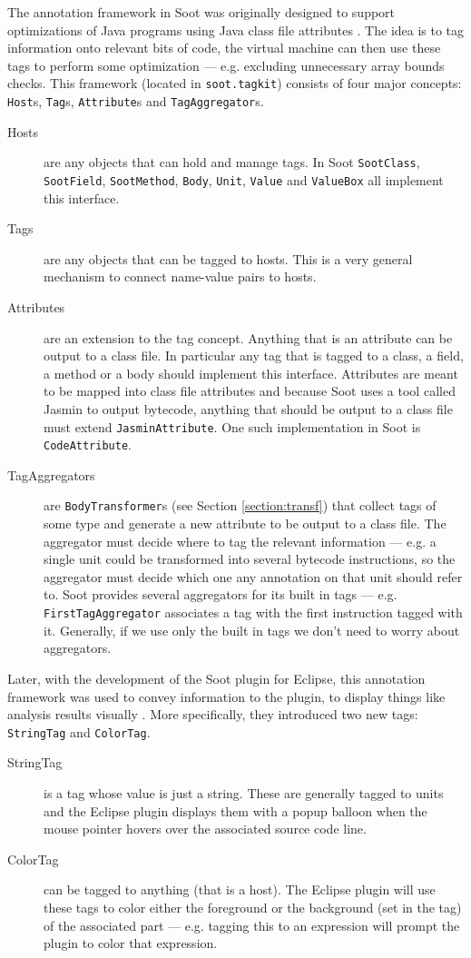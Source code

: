 \documentclass{article}
\newcommand{\code}[1]{\texttt{\small #1}}
\begin{document}
The annotation framework in Soot was originally designed to support
optimizations of Java programs using Java class file attributes
\cite{pominville00framework}. The idea is to tag information onto
relevant bits of code, the virtual machine can then use these tags to
perform some optimization --- e.g. excluding unnecessary array bounds
checks.  This framework (located in \code{soot.tagkit}) consists of
four major concepts: \code{Host}s, \code{Tag}s, \code{Attribute}s and
\code{TagAggregator}s.
\begin{description}
\item[Hosts] are any objects that can hold and manage tags. In Soot
  \code{SootClass}, \code{SootField}, \code{SootMethod}, \code{Body},
  \code{Unit}, \code{Value} and \code{ValueBox} all implement this
  interface.
\item[Tags] are any objects that can be tagged to hosts. This is a
  very general mechanism to connect name-value pairs to hosts.
\item[Attributes] are an extension to the tag concept. Anything that
  is an attribute can be output to a class file. In particular any tag
  that is tagged to a class, a field, a method or a body should
  implement this interface. Attributes are meant to be mapped into
  class file attributes and because Soot uses a tool called Jasmin to
  output bytecode, anything that should be output to a class file must
  extend \code{JasminAttribute}. One such implementation in Soot is
  \code{CodeAttribute}.
\item[TagAggregators] are \code{BodyTransformer}s (see
  Section \ref{section:transf}) that collect tags of some type and generate
  a new attribute to be output to a class file. The aggregator must
  decide where to tag the relevant information --- e.g. a single unit
  could be transformed into several bytecode instructions, so the
  aggregator must decide which one any annotation on that unit should
  refer to. Soot provides several aggregators for its built in tags
  --- e.g. \code{FirstTagAggregator} associates a tag with the first
  instruction tagged with it. Generally, if we use only the built in
  tags we don't need to worry about aggregators.
\end{description}

Later, with the development of the Soot plugin for Eclipse, this
annotation framework was used to convey information to the plugin, to
display things like analysis results visually \cite{lhot.lhot.ea04}.
More specifically, they introduced two new tags: \code{StringTag} and
\code{ColorTag}.
\begin{description}
\item[StringTag] is a tag whose value is just a string. These are
  generally tagged to units and the Eclipse plugin displays them with
  a popup balloon when the mouse pointer hovers over the associated
  source code line.
\item[ColorTag] can be tagged to anything (that is a host). The
  Eclipse plugin will use these tags to color either the foreground or
  the background (set in the tag) of the associated part --- e.g.
  tagging this to an expression will prompt the plugin to color that
  expression.
\end{description}
\end{document}
